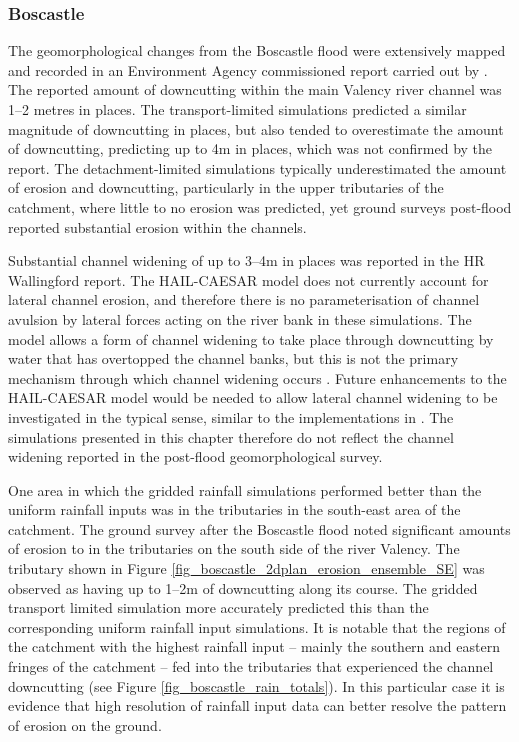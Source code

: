 \subsubsection{Boscastle}
The geomorphological changes from the Boscastle flood were extensively mapped and recorded in an Environment Agency commissioned report carried out by \citet{wallingford2005flooding}. The reported amount of downcutting within the main Valency river channel was 1--2 metres in places. The transport-limited simulations predicted  a similar magnitude of downcutting in places, but also tended to overestimate the amount of downcutting, predicting up to 4m in places, which was not confirmed by the \citet{wallingford2005flooding} report. The detachment-limited simulations typically underestimated the amount of erosion and downcutting, particularly in the upper tributaries of the catchment, where little to no erosion was predicted, yet ground surveys post-flood reported substantial erosion within the channels. 

Substantial channel widening of up to 3--4m in places was reported in the HR Wallingford report. The HAIL-CAESAR model does not currently account for lateral channel erosion, and therefore there is no parameterisation of channel avulsion by lateral forces acting on the river bank in these simulations. The model allows a form of channel widening to take place through downcutting by water that has overtopped the channel banks, but this is not the primary mechanism through which channel widening occurs \citep{parker1976cause}. Future enhancements to the HAIL-CAESAR model would be needed to allow lateral channel widening to be investigated in the typical sense, similar to the implementations in \citet{murray1997properties,Coulthard2013}. The simulations presented in this chapter therefore do not reflect the channel widening reported in the post-flood geomorphological survey.

One area in which the gridded rainfall simulations performed better than the uniform rainfall inputs was in the tributaries in the south-east area of the catchment. The ground survey after the Boscastle flood noted significant amounts of erosion to in the tributaries on the south side of the river Valency. The tributary shown in Figure \ref{fig_boscastle_2dplan_erosion_ensemble_SE} was observed as having up to 1--2m of downcutting along its course. The gridded transport limited simulation more accurately predicted this than the corresponding uniform rainfall input simulations. It is notable that the regions of the catchment with the highest rainfall input -- mainly the southern and eastern fringes of the catchment -- fed into the tributaries that experienced the channel downcutting (see Figure \ref{fig_boscastle_rain_totals}). In this particular case it is evidence that high resolution of rainfall input data can better resolve the pattern of erosion on the ground.

